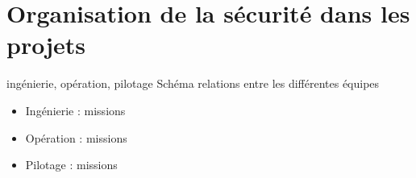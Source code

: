 

\section{Organisation de la sécurité dans les projets}
ingénierie, opération, pilotage
Schéma relations entre les différentes équipes
\begin{itemize}
    \item Ingénierie : missions
    \item Opération : missions
    \item Pilotage : missions
\end{itemize}



